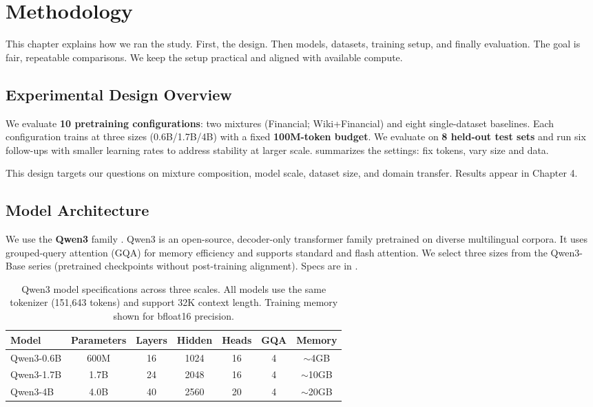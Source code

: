 \chapter{Methodology}

This chapter explains how we ran the study. First, the design. Then models, datasets, training setup, and finally evaluation. The goal is fair, repeatable comparisons. We keep the setup practical and aligned with available compute.

\section{Experimental Design Overview}

We evaluate \textbf{10 pretraining configurations}: two mixtures (Financial; Wiki+Financial) and eight single-dataset baselines. Each configuration trains at three sizes (0.6B/1.7B/4B) with a fixed \textbf{100M-token budget}. We evaluate on \textbf{8 held-out test sets} and run six follow-ups with smaller learning rates to address stability at larger scale.  summarizes the settings: fix tokens, vary size and data.



This design targets our questions on mixture composition, model scale, dataset size, and domain transfer. Results appear in Chapter 4.

\section{Model Architecture}

We use the \textbf{Qwen3} family \parencite{yang2024qwen2}. Qwen3 is an open-source, decoder-only transformer family pretrained on diverse multilingual corpora. It uses grouped-query attention (GQA) for memory efficiency and supports standard and flash attention. We select three sizes from the Qwen3-Base series (pretrained checkpoints without post-training alignment). Specs are in .

\begin{table}[h]
\centering
\caption[Qwen3 Model Specifications]{Qwen3 model specifications across three scales. All models use the same tokenizer (151,643 tokens) and support 32K context length. Training memory shown for bfloat16 precision.}
\label{tab:model_specs}
\begin{tabular}{lcccccc}
\toprule
\textbf{Model} & \textbf{Parameters} & \textbf{Layers} & \textbf{Hidden} & \textbf{Heads} & \textbf{GQA} & \textbf{Memory} \\
\midrule
Qwen3-0.6B & 600M & 16 & 1024 & 16 & 4 & $\sim$4GB \\
Qwen3-1.7B & 1.7B & 24 & 2048 & 16 & 4 & $\sim$10GB \\
Qwen3-4B & 4.0B & 40 & 2560 & 20 & 4 & $\sim$20GB \\
\bottomrule
\end{tabular}
\end{table}

